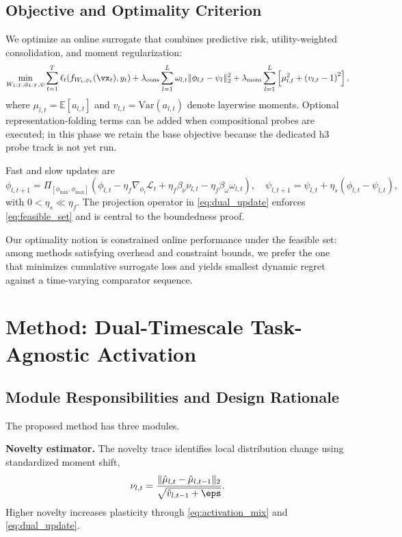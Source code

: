 \documentclass{article} %
\begin{document}
\subsection{Objective and Optimality Criterion}
We optimize an online surrogate that combines predictive risk, utility-weighted consolidation, and moment regularization:
\begin{equation}
\min_{W_{1:T},\phi_{1:T},\psi}\sum_{t=1}^T \ell_t\!\left(f_{W_t,\phi_t}(\vx_t),y_t\right)
+\lambda_{\mathrm{cons}}\sum_{l=1}^L \omega_{l,t}\|\phi_{l,t}-\psi_l\|_2^2
+\lambda_{\mathrm{mom}}\sum_{l=1}^L \left[\mu_{l,t}^2+\left(v_{l,t}-1\right)^2\right],
\label{eq:objective}
\end{equation}
where $\mu_{l,t}=\mathbb{E}[a_{l,t}]$ and $v_{l,t}=\mathrm{Var}(a_{l,t})$ denote layerwise moments. Optional representation-folding terms can be added when compositional probes are executed; in this phase we retain the base objective because the dedicated h3 probe track is not yet run.

Fast and slow updates are
\begin{equation}
\phi_{l,t+1}=\Pi_{[\phi_{\min},\phi_{\max}]}
\left(\phi_{l,t}-\eta_f\nabla_{\phi_l}\mathcal{L}_t+\eta_f\beta_\nu\nu_{l,t}-\eta_f\beta_\omega\omega_{l,t}\right),
\quad
\psi_{l,t+1}=\psi_{l,t}+\eta_s(\phi_{l,t}-\psi_{l,t}),
\label{eq:dual_update}
\end{equation}
with $0<\eta_s\ll\eta_f$. The projection operator in \eqref{eq:dual_update} enforces \eqref{eq:feasible_set} and is central to the boundedness proof.

Our optimality notion is constrained online performance under the feasible set: among methods satisfying overhead and constraint bounds, we prefer the one that minimizes cumulative surrogate loss and yields smallest dynamic regret against a time-varying comparator sequence.

\section{Method: Dual-Timescale Task-Agnostic Activation}
\subsection{Module Responsibilities and Design Rationale}
The proposed method has three modules.

\textbf{Novelty estimator.}
The novelty trace identifies local distribution change using standardized moment shift,
\begin{equation}
\nu_{l,t}=\frac{\|\hat\mu_{l,t}-\hat\mu_{l,t-1}\|_2}{\sqrt{\hat v_{l,t-1}+\eps}}.
\label{eq:novelty}
\end{equation}
Higher novelty increases plasticity through \eqref{eq:activation_mix} and \eqref{eq:dual_update}.
\end{document}
